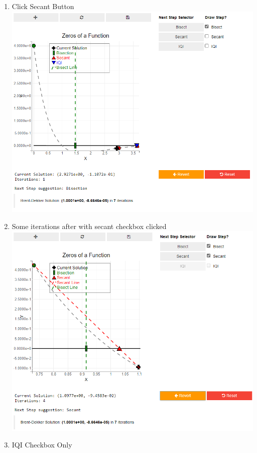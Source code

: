 \begin{enumerate}
    \item Click Secant Button\\
    \includegraphics[scale=0.6]{Include/Images/Thesis/Documentation/Visualizers/NonLinear/Example 1/Example 1 - 02 - Click Secant.png}
    \item Some iterations after with secant checkbox clicked\\
    \includegraphics[scale=0.6]{Include/Images/Thesis/Documentation/Visualizers/NonLinear/Example 1/Example 1 - 03 - SOme iterations with secant checkbox.png}
    \item IQI Checkbox Only\\

\end{enumerate}
